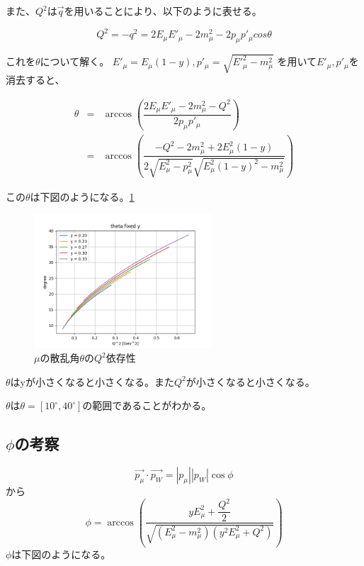 また、$Q^2$は$\vec{q}$を用いることにより、以下のように表せる。

\begin{equation}
    Q^2 = -q^2 = 2E_\mu E'_\mu -2m^2_\mu-2p_\mu p'_\mu cos\theta
\end{equation}

これを$\theta$について解く。
$E'_\mu = E_\mu(1-y), p'_\mu = \sqrt{E'^2_\mu - m^2_\mu}$
を用いて$E'_\mu, p'_\mu$を消去すると、

\begin{eqnarray}
    \theta & = &\arccos{(\dfrac {2E_\mu E'_\mu -2m^2_\mu-Q^2}{2p_\mu p'_\mu})} \\
    & = & \arccos{(\dfrac{-Q^2-2m^2_\mu+2E^2_\mu(1-y)}{2\sqrt{E^2_\mu-p^2_\mu}\sqrt{E^2_\mu(1-y)^2-m^2_\mu} } )}
\end{eqnarray}

この$\theta$は下図のようになる。\ref{fig:angle3}

\begin{figure}[H]
    \centering
    \includegraphics[height=5cm]{img/theta_degree_y_fixed.png}
    \caption{$\mu$の散乱角$\theta$の$Q^2$依存性}
    \label{fig:angle3}
\end{figure}

$\theta$はyが小さくなると小さくなる。また$Q^2$が小さくなると小さくなる。

$\theta$は$\theta=[10^\circ,40^\circ]$の範囲であることがわかる。


\subsection{$\phi$の考察}
\begin{equation}
    \vec{p_\mu} \cdot \vec{p_W} = |p_\mu| |p_W| \cos\phi
\end{equation}
から
\begin{equation}
    \phi = \arccos{(\dfrac{yE^2_\mu + \dfrac{Q^2}{2}} {\sqrt{(E^2_\mu - m^2_\mu)(y^2E^2_\mu+Q^2)}} ) }
\end{equation}
$\phi$は下図のようになる。

